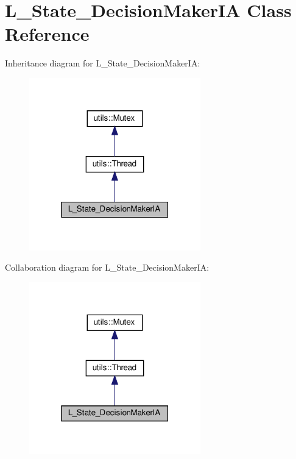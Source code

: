 \hypertarget{classL__State__DecisionMakerIA}{}\section{L\+\_\+\+State\+\_\+\+Decision\+Maker\+IA Class Reference}
\label{classL__State__DecisionMakerIA}


Inheritance diagram for L\+\_\+\+State\+\_\+\+Decision\+Maker\+IA\+:
\nopagebreak
\begin{figure}[H]
\begin{center}
\leavevmode
\includegraphics[width=211pt]{classL__State__DecisionMakerIA__inherit__graph}
\end{center}
\end{figure}


Collaboration diagram for L\+\_\+\+State\+\_\+\+Decision\+Maker\+IA\+:
\nopagebreak
\begin{figure}[H]
\begin{center}
\leavevmode
\includegraphics[width=211pt]{classL__State__DecisionMakerIA__coll__graph}
\end{center}
\end{figure}
